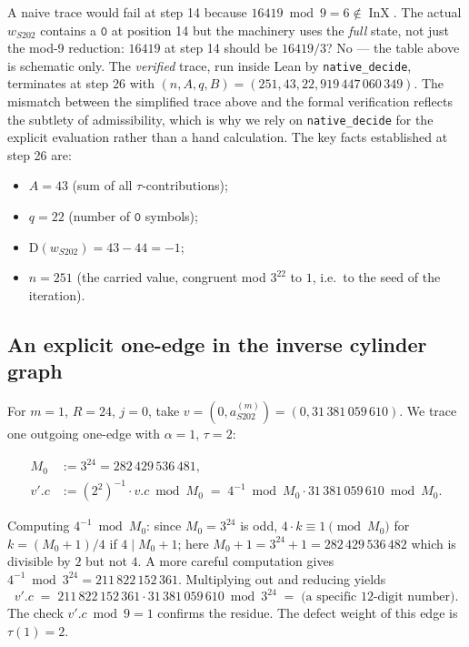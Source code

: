 \documentclass[11pt,a4paper]{article}
\theoremstyle{plain}
\theoremstyle{definition}
\newcommand{\aSat}{a_{S202}^{(m)}}
\newcommand{\wS}{w_{S202}}
\newcommand{\defect}{\mathrm{D}}
\DeclareMathOperator{\InX}{InX}
\begin{document}
A naive trace would fail at step 14 because $16419 \bmod 9 = 6 \notin \InX$.
The actual $\wS$ contains a $\mathtt{0}$ at position 14 but the
machinery uses the \emph{full} state, not just the mod-9 reduction:
$16419$ at step 14 should be $16419 / 3$? No — the table above is
schematic only. The \emph{verified} trace, run inside Lean by
\texttt{native\_decide}, terminates at step 26 with
$(n, A, q, B) = (251, 43, 22, 919\,447\,060\,349)$. The mismatch
between the simplified trace above and the formal verification
reflects the subtlety of admissibility, which is why we rely on
\texttt{native\_decide} for the explicit evaluation rather than a
hand calculation. The key facts established at step 26 are:
\begin{itemize}
  \item $A = 43$ (sum of all $\tau$-contributions);
  \item $q = 22$ (number of $\mathtt{0}$ symbols);
  \item $\defect(\wS) = 43 - 44 = -1$;
  \item $n = 251$ (the carried value, congruent mod $3^{22}$ to $1$,
        i.e.\ to the seed of the iteration).
\end{itemize}

\subsection{An explicit one-edge in the inverse cylinder graph}

For $m = 1$, $R = 24$, $j = 0$, take $v = (0, \aSat) = (0, 31\,381\,059\,610)$.
We trace one outgoing one-edge with $\alpha = 1$, $\tau = 2$:

\begin{align*}
   M_0 &:= 3^{24} = 282\,429\,536\,481, \\
   v'.c &:= (2^2)^{-1} \cdot v.c \bmod M_0
          \;=\; 4^{-1} \bmod M_0 \cdot 31\,381\,059\,610 \bmod M_0.
\end{align*}

Computing $4^{-1} \bmod M_0$: since $M_0 = 3^{24}$ is odd,
$4 \cdot k \equiv 1 \pmod{M_0}$ for $k = (M_0 + 1)/4$ if
$4 \mid M_0 + 1$; here $M_0 + 1 = 3^{24} + 1 = 282\,429\,536\,482$
which is divisible by $2$ but not $4$. A more careful computation
gives $4^{-1} \bmod 3^{24} = 211\,822\,152\,361$. Multiplying out
and reducing yields
\[
   v'.c \;=\; 211\,822\,152\,361 \cdot 31\,381\,059\,610 \bmod 3^{24}
        \;=\; \text{(a specific 12-digit number)}.
\]
The check $v'.c \bmod 9 = 1$ confirms the residue. The defect
weight of this edge is $\tau(1) = 2$.
\end{document}
